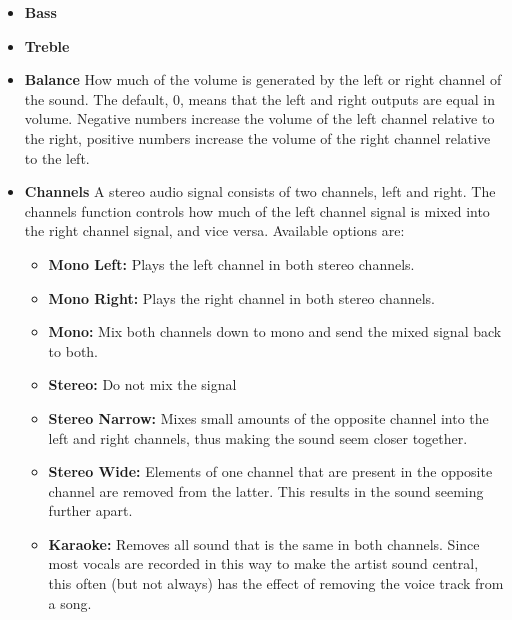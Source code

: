 \begin{itemize}
\item \textbf{Bass}
\item \textbf{Treble}
\item \textbf{Balance}
  How much of the volume is generated by the left or right channel of the sound.  The default, 0, means that the left and right outputs are equal in volume.  Negative numbers increase the volume of the left channel relative to the right, positive numbers increase the volume of the right channel relative to the left.
\item \textbf{Channels}
  A stereo audio signal consists of two channels, left and right.  The channels function controls how much of the left channel signal is mixed into the right channel signal, and vice versa.
    Available options are:
  
  \begin{itemize}
  \item \textbf{Mono Left: }Plays the left channel in both stereo channels.
  \item \textbf{Mono Right:} Plays the right channel in both stereo channels.
  \item \textbf{Mono:} Mix both channels down to mono and send the mixed signal
    back to both.
  \item \textbf{Stereo:} Do not mix the signal
  \item \textbf{Stereo Narrow: }Mixes small amounts of the opposite channel into
    the left and right channels, thus making the sound seem closer
    together.
  \item \textbf{Stereo Wide:} Elements of one channel that are present in the
    opposite channel are removed from the latter.  This results in the
    sound seeming further apart.
  \item \textbf{Karaoke:} Removes all sound that is the same in both channels. 
    Since most vocals are recorded in this way to make the artist sound
    central, this often (but not always) has the effect of removing the
    voice track from a song.
  \end{itemize}
  

\end{itemize}
